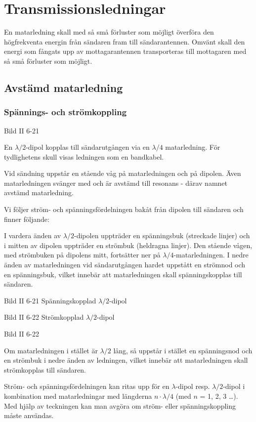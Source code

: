 \section{Transmissionsledningar}

En matarledning skall med så små förluster som möjligt överföra den
högfrekventa energin från sändaren fram till sändarantennen.  Omvänt
skall den energi som fångats upp av mottagarantennen transporteras
till mottagaren med så små förluster som möjligt.

\subsection{Avstämd matarledning}

\subsubsection{Spännings- och strömkoppling}

Bild II 6-21

En \(\lambda/2\)-dipol kopplas till sändarutgången via en
\(\lambda/4\) matarledning. För tydlighetens skull visas ledningen som
en bandkabel.

Vid sändning uppstår en stående våg på matarledningen och på
dipolen. Även matarledningen svänger med och är avstämd till resonans
- därav namnet avstämd matarledning.

Vi följer ström- och spänningsfördelningen bakåt från dipolen till
sändaren och finner följande:

I vardera änden av \(\lambda/2\)-dipolen uppträder en spänningsbuk
(streckade linjer) och i mitten av dipolen uppträder en strömbuk
(heldragna linjer). Den stående vågen, med strömbuken på dipolens
mitt, fortsätter ner på \(\lambda/4\)-matarledningen. I nedre änden av
matarledningen vid sändarutgången hardet uppstått en strömnod och en
spänningsbuk, vilket innebär att matarledningen skall spänningskopplas
till sändaren.

Bild II 6-21 Spänningskopplad \(\lambda/2\)-dipol

Bild II 6-22 Strömkopplad \(\lambda/2\)-dipol

Bild II 6-22

Om matarledningen i stället är \(\lambda/2\) lång, så uppstår i
stället en spänningsnod och en strömbuk i nedre änden av ledningen,
vilket innebär att matarledningen skall strömkopplas till sändaren.

Ström- och spänningsfördelningen kan ritas upp för en
\(\lambda\)-dipol resp.  \(\lambda/2\)-dipol i kombination med
matarledningar med längderna \(n \cdot \lambda/4\) (med \(n\) = 1, 2,
3 \dots). Med hjälp av teckningen kan man avgöra om ström- eller
spänningskoppling måste användas.

